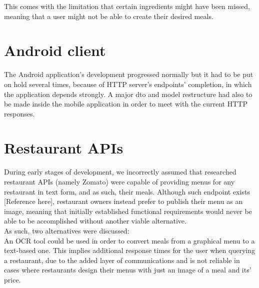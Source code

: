     This comes with the limitation that certain ingredients might have been missed,
    meaning that a user might not be able to create their desired meals.

    \section{Android client}

    The Android application's development progressed normally but it had to be put on hold several times, because of HTTP server's endpoints' completion, in which the application
    depends strongly. A major dto and model restructure had also to be made inside the mobile application in order to meet with the current HTTP responses.\\

    \section{Restaurant APIs}

    During early stages of development, 
    we incorrectly assumed that researched restaurant APIs (namely Zomato) were capable 
    of providing menus for any restaurant in text form, and as such, their meals. Although such endpoint exists [Reference here], 
    restaurant owners instead prefer to publish their menu as an image, 
    meaning that initially established functional requirements would never be able to be accomplished without 
    another viable alternative.\\

    As such, two alternatives were discussed:\\

    An OCR tool could be used in order to convert meals from a graphical menu to a text-based one.
    This implies additional response times for the user when querying a restaurant, due to the added layer 
    of communications and is not reliable in cases where restaurants
    design their menus with just an image of a meal and its' price.

